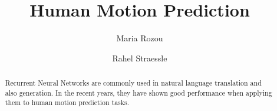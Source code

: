 \documentclass[sigconf]{acmart}
\begin{document}
\title{Human Motion Prediction}

\author{Maria Rozou}\affiliation{}

\author{Rahel Straessle}\affiliation{}

\begin{abstract}
Recurrent Neural Networks are commonly used in natural language translation and also generation. In the recent years, they have shown good performance when applying them to human motion prediction tasks. 
\end{abstract}

\maketitle





\end{document}
